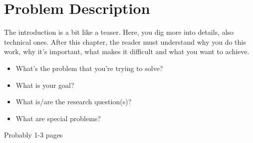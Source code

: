 \chapter{Problem Description}
\label{chapter:ProblemDescription}

The introduction is a bit like a teaser. Here, you dig more into details, also
technical ones. After this chapter, the reader must understand why you do this
work, why it's important, what makes it difficult and what you want to achieve.

\begin{itemize}
\item What's the problem that you're trying to solve?
\item What is your goal?
\item What is/are the research question(s)?
\item What are special problems?
\end{itemize}

Probably 1-3 pages
